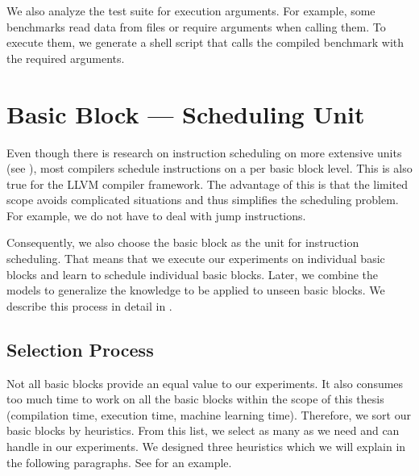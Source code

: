 We also analyze the test suite for execution arguments.
For example, some benchmarks read data from files or require arguments when calling them.
To execute them, we generate a shell script that calls the compiled benchmark with the required arguments.

\section{Basic Block --- Scheduling Unit}
\label{sec:approach:basicblock}
Even though there is research on instruction scheduling on more extensive units (see ), most compilers schedule instructions on a per basic block level.
This is also true for the LLVM compiler framework.
The advantage of this is that the limited scope avoids complicated situations and thus simplifies the scheduling problem.
For example, we do not have to deal with jump instructions.

Consequently, we also choose the basic block as the unit for instruction scheduling.
That means that we execute our experiments on individual basic blocks and learn to schedule individual basic blocks.
Later, we combine the models to generalize the knowledge to be applied to unseen basic blocks.
We describe this process in detail in .

\subsection{Selection Process}
\label{sec:approach:basicblock:selection}
Not all basic blocks provide an equal value to our experiments.
It also consumes too much time to work on all the basic blocks within the scope of this thesis (\eg compilation time, execution time, machine learning time).
Therefore, we sort our basic blocks by heuristics. 
From this list, we select as many as we need and can handle in our experiments.
We designed three heuristics which we will explain in the following paragraphs.
See  for an example.

